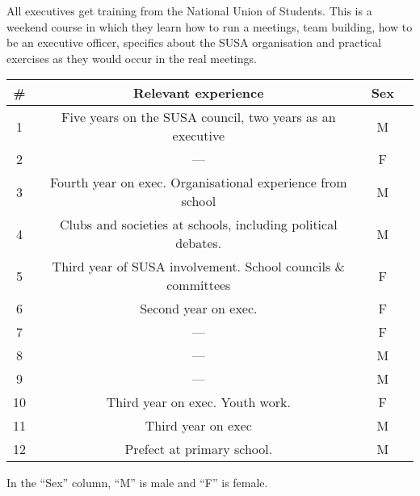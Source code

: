 \documentclass[a4paper,12pt,titlepage]{report}
\begin{document}
  All executives get training from the National Union of Students. This is a weekend
  course in which they learn how to run a meetings, team building, how to be an
  executive officer, specifics about the SUSA organisation and practical exercises
  as they would occur in the real meetings.
  
  \begin{table}[h]
    \begin{center}  
      \begin{tabular*}{1.0\textwidth}
        {@{\extracolsep{\fill}}cccr}
        \hline
        \# & Relevant experience & Sex \\
        \hline
        1 & Five years on the SUSA council, two years as an executive & M \\
        2 & --- & F \\
        3 & Fourth year on exec. Organisational experience from school & M \\
        4 & Clubs and societies at schools, including political debates. & M \\
        5 & Third year of SUSA involvement. School councils \& committees & F \\
        6 & Second year on exec. & F \\
        7 & --- & F \\
        8 & --- & M \\
        9 & --- & M \\
        10 & Third year on exec. Youth work. & F \\
        11 & Third year on exec  & M \\
        12 & Prefect at primary school.  & M \\
        \hline
      \end{tabular*}
    \end{center}
      \small{In the ``Sex'' column, ``M'' is male and ``F'' is female.}
  \end{table}
\end{document}
